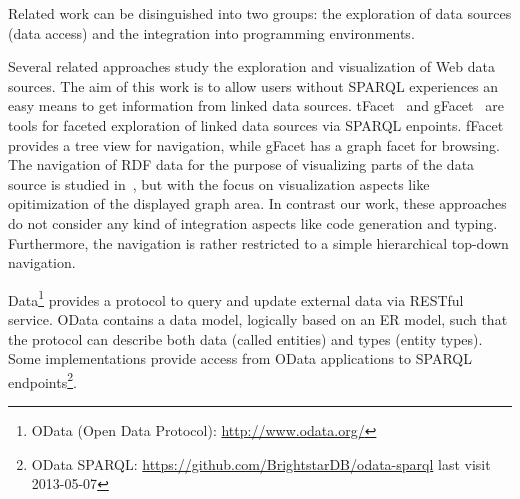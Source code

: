 \documentclass{llncs} %
\begin{document}
Related work can be disinguished into two groups: the exploration of data sources (data access)
and the integration into programming environments.

Several related approaches study the exploration and visualization of Web data sources. 
The aim of this work is to allow users without SPARQL experiences an easy means to
get information from linked data sources.
tFacet~\cite{tFacet} and gFacet~\cite{heim2008gfacet} are tools for faceted exploration of linked data sources
via SPARQL enpoints. fFacet provides a tree view for navigation, while gFacet has a graph facet for browsing.
The navigation of RDF data for the purpose of visualizing parts of the data source is studied in~\cite{DBLP:conf/iv/DokulilK08},
but with the focus on visualization aspects like opitimization of the displayed graph area.
In contrast our work, these approaches do not consider any kind of integration aspects like code generation and typing.
Furthermore, the navigation is rather restricted to a simple hierarchical top-down navigation.

Data\footnote{OData (Open Data Protocol): \url{http://www.odata.org/}}  provides a protocol to query and update external data via RESTful service.
OData contains a data model, logically based on an ER model, such that the protocol can describe both data (called entities) and types (entity types).
Some implementations provide access from OData applications to SPARQL endpoints\footnote{OData SPARQL: \url{https://github.com/BrightstarDB/odata-sparql} last visit 2013-05-07}.



 
\end{document}
